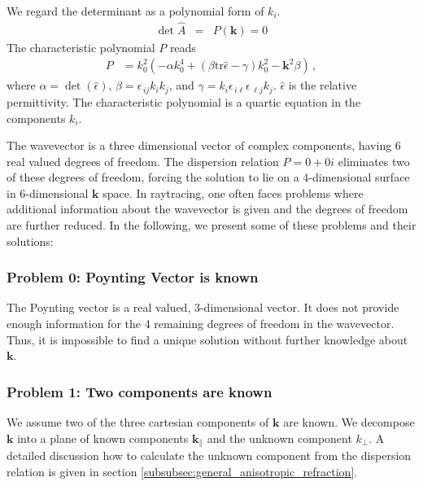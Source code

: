 \documentclass[12pt,a4paper,twoside,openright,BCOR10mm,headsepline,titlepage,abstracton,chapterprefix,final]{scrreprt}
\newcommand\Vector[1]{{\mathbf{#1}}}
\newcommand\wavenumber{k}
\newcommand\Wavevector{\Vector{\wavenumber}}
\newcommand\Tensor[1]{\hat{#1}}
\newcommand\scalarrelativepermittivity{\epsilon}
\newcommand\relativepermittivity{\Tensor{\scalarrelativepermittivity}}
\newcommand\tr{\text{tr}}
\begin{document}
We regard the determinant as a polynomial form of $\wavenumber_i$.
\begin{eqnarray}
 \det \hat{A} &=& P(\Wavevector) = 0
\end{eqnarray}
The characteristic polynomial $P$ reads
\begin{align}
 P &= k_0^2 \left( -\alpha k_0^4 +  (\beta \tr\relativepermittivity - \gamma) k_0^2 - \Vector{k}^2 \beta \right)\,,\label{eq:dispersion_determinant_invariant}
\end{align}
where 
$\alpha = \det(\relativepermittivity)$,
$\beta = \scalarrelativepermittivity_{\,ij} k_i k_j$, 
and
$\gamma = k_i \scalarrelativepermittivity_{\,i\ell} \scalarrelativepermittivity_{\,\ell j} k_j$.
$\relativepermittivity$ is the  relative permittivity.
The characteristic polynomial is a quartic equation in the components $\wavenumber_i$.

The wavevector is a three dimensional vector of complex components, having 6 real valued degrees of freedom.
The dispersion relation $P=0+0i$ eliminates two of these degrees of freedom,
forcing the solution to lie on a 4-dimensional surface in 6-dimensional $\Wavevector$ space.
In raytracing, one often faces problems where additional information about the wavevector is given and the
degrees of freedom are further reduced. In the following, we present some of these problems and their solutions:

\subsubsection{Problem 0: Poynting Vector is known}
The Poynting vector is a real valued, 3-dimensional vector.
It does not provide enough information for the 4 remaining degrees of freedom in the wavevector.
Thus, it is impossible to find a unique solution without further knowledge about $\Wavevector$.

\subsubsection{Problem 1: Two components are known}
\label{subsubsec:two_components_known}
We assume two of the three cartesian components of $\Wavevector$ are known.
We decompose $\Wavevector$ into a plane of known components $\Wavevector_\parallel$ and the unknown component $\wavenumber_\perp$. 
A detailed discussion how to calculate the unknown component from the dispersion relation
is given in section \ref{subsubsec:general_anisotropic_refraction}.
\end{document}
